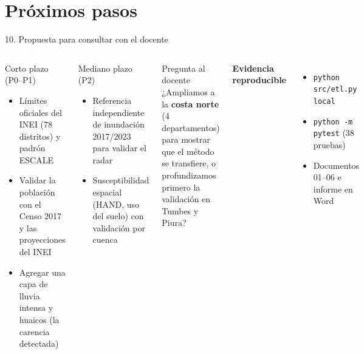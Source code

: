 \documentclass[aspectratio=169,11pt]{beamer}
\begin{document}
\section{Próximos pasos}
\begin{frame}{10. Propuesta para consultar con el docente}
\begin{columns}[T]
\begin{block}{Corto plazo (P0--P1)}\footnotesize
\begin{itemize}
\item Límites oficiales del INEI (78 distritos) y padrón ESCALE
\item Validar la población con el Censo 2017 y las proyecciones del INEI
\item Agregar una capa de lluvia intensa y huaicos (la carencia detectada)
\end{itemize}
\end{block}
\begin{block}{Mediano plazo (P2)}\footnotesize
\begin{itemize}
\item Referencia independiente de inundación 2017/2023 para validar el radar
\item Susceptibilidad espacial (HAND, uso del suelo) con validación por cuenca
\end{itemize}
\end{block}
\begin{exampleblock}{Pregunta al docente}\small
¿Ampliamos a la \textbf{costa norte} (4 departamentos) para mostrar que el método se transfiere, o profundizamos primero la validación en Tumbes y Piura?
\end{exampleblock}
\vspace{2mm}
\small\textbf{Evidencia reproducible}
\begin{itemize}\footnotesize
\item \texttt{python src/etl.py local}
\item \texttt{python -m pytest} (38 pruebas)
\item Documentos 01--06 e informe en Word
\end{itemize}
\end{columns}
\end{frame}

{
\begin{frame}
\end{frame}}
\end{document}
